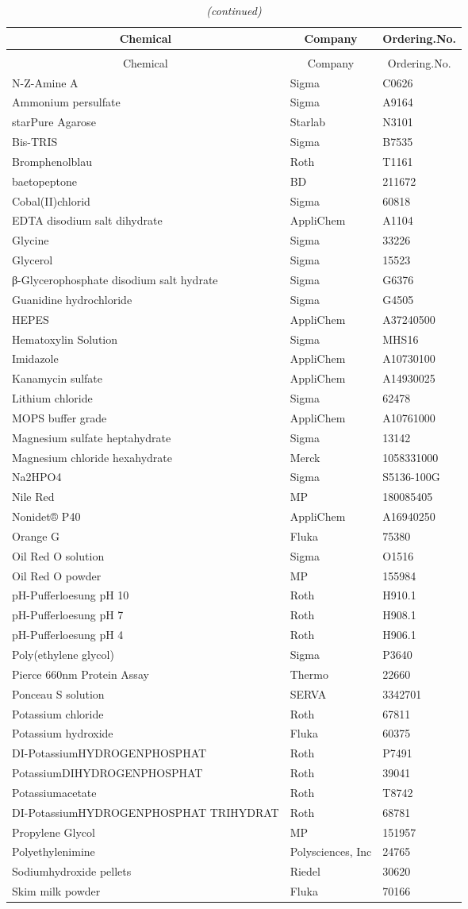 \setlongtables\begin{longtable}{lll}\caption{chemical} \tabularnewline
\hline\hline
\multicolumn{1}{c}{Chemical}&\multicolumn{1}{c}{Company}&\multicolumn{1}{c}{Ordering.No.}\tabularnewline
\hline
\endfirsthead\caption[]{\em (continued)} \tabularnewline
\hline
\multicolumn{1}{c}{Chemical}&\multicolumn{1}{c}{Company}&\multicolumn{1}{c}{Ordering.No.}\tabularnewline
\hline
\endhead
\hline
\endfoot
\label{chemical}
N-Z-Amine A&Sigma&C0626\tabularnewline
Ammonium persulfate&Sigma&A9164\tabularnewline
starPure Agarose&Starlab&N3101\tabularnewline
Bis-TRIS&Sigma&B7535\tabularnewline
Bromphenolblau&Roth&T1161\tabularnewline
baetopeptone&BD&211672\tabularnewline
Cobal(II)chlorid&Sigma&60818\tabularnewline
EDTA disodium salt dihydrate&AppliChem&A1104\tabularnewline
Glycine&Sigma&33226\tabularnewline
Glycerol&Sigma&15523\tabularnewline
β-Glycerophosphate disodium salt hydrate&Sigma&G6376\tabularnewline
Guanidine hydrochloride&Sigma&G4505\tabularnewline
HEPES&AppliChem&A37240500\tabularnewline
Hematoxylin Solution&Sigma&MHS16\tabularnewline
Imidazole&AppliChem&A10730100\tabularnewline
Kanamycin sulfate&AppliChem&A14930025\tabularnewline
Lithium chloride&Sigma&62478\tabularnewline
MOPS buffer grade&AppliChem&A10761000\tabularnewline
Magnesium sulfate heptahydrate&Sigma&13142\tabularnewline
Magnesium chloride hexahydrate&Merck&1058331000\tabularnewline
Na2HPO4&Sigma&S5136-100G\tabularnewline
Nile Red&MP&180085405\tabularnewline
Nonidet® P40&AppliChem&A16940250\tabularnewline
Orange G&Fluka&75380\tabularnewline
Oil Red O solution&Sigma&O1516\tabularnewline
Oil Red O powder&MP&155984\tabularnewline
pH-Pufferloesung pH 10&Roth&H910.1\tabularnewline
pH-Pufferloesung pH 7&Roth&H908.1\tabularnewline
pH-Pufferloesung pH 4&Roth&H906.1\tabularnewline
Poly(ethylene glycol) &Sigma&P3640\tabularnewline
Pierce 660nm Protein Assay&Thermo&22660\tabularnewline
Ponceau S solution&SERVA&3342701\tabularnewline
Potassium chloride&Roth&67811\tabularnewline
Potassium hydroxide&Fluka&60375\tabularnewline
DI-PotassiumHYDROGENPHOSPHAT&Roth&P7491\tabularnewline
PotassiumDIHYDROGENPHOSPHAT&Roth&39041\tabularnewline
Potassiumacetate&Roth&T8742\tabularnewline
DI-PotassiumHYDROGENPHOSPHAT TRIHYDRAT&Roth&68781\tabularnewline
Propylene Glycol&MP&151957\tabularnewline
Polyethylenimine&Polysciences, Inc&24765\tabularnewline
\newpage
Sodiumhydroxide pellets&Riedel&30620\tabularnewline
Skim milk powder&Fluka&70166\tabularnewline

\end{longtable}

